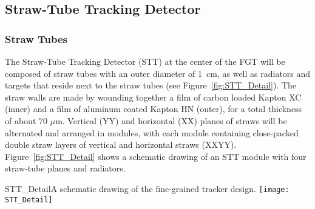 \subsection{Straw-Tube Tracking Detector}
\label{cdrsec:detectors-nd-ref-fgt}


\subsubsection{Straw Tubes} 
\label{cdrsec:detectors-nd-ref-fgt-stt}

The Straw-Tube Tracking Detector (STT) at the center of the FGT 
will be composed of straw tubes with an outer diameter of 1~cm, as well as 
radiators and targets that reside next to the straw tubes (see Figure~\ref{fig:STT_Detail}).
The straw walls are made by wounding together a film of carbon loaded Kapton XC (inner) and 
a film of aluminum coated Kapton HN (outer), for a total thickness of about 70 $\mu$m. 
Vertical (YY) and horizontal (XX) planes of straws will be alternated and 
arranged in modules, with each module containing close-packed double straw layers 
of vertical and horizontal straws (XXYY). 
Figure~\ref{fig:STT_Detail} shows a schematic drawing of an STT module with four straw-tube planes and
radiators. 

\begin{cdrfigure}{STT_Detail}{A schematic drawing of the fine-grained tracker design.}
\texttt{[image: STT\_Detail]}
\end{cdrfigure}


